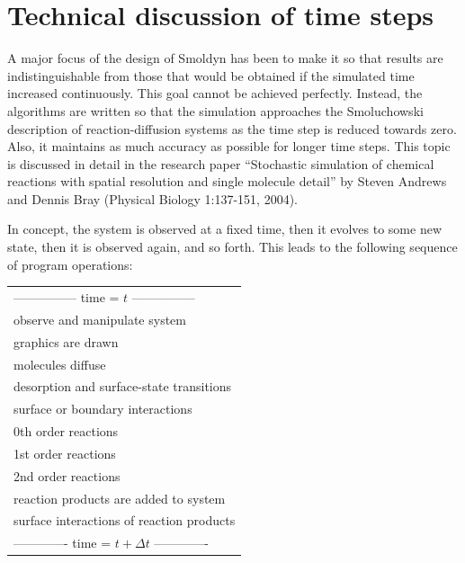 \documentclass {book}
\begin{document}
\section{Technical discussion of time steps}

A major focus of the design of Smoldyn has been to make it so that results are indistinguishable from those that would be obtained if the simulated time increased continuously. This goal cannot be achieved perfectly. Instead, the algorithms are written so that the simulation approaches the Smoluchowski description of reaction-diffusion systems as the time step is reduced towards zero. Also, it maintains as much accuracy as possible for longer time steps. This topic is discussed in detail in the research paper ``Stochastic simulation of chemical reactions with spatial resolution and single molecule detail'' by Steven Andrews and Dennis Bray (Physical Biology 1:137-151, 2004).

In concept, the system is observed at a fixed time, then it evolves to some new state, then it is observed again, and so forth. This leads to the following sequence of program operations:

\begin{longtable}[c]{l}
--------------- time = $t$ ---------------\\
observe and manipulate system\\
graphics are drawn\\
molecules diffuse\\
desorption and surface-state transitions\\
surface or boundary interactions\\
0th order reactions\\
1st order reactions\\
2nd order reactions\\
reaction products are added to system\\
surface interactions of reaction products\\
------------- time = $t + \Delta t$ -------------
\end{longtable}
\end{document}
